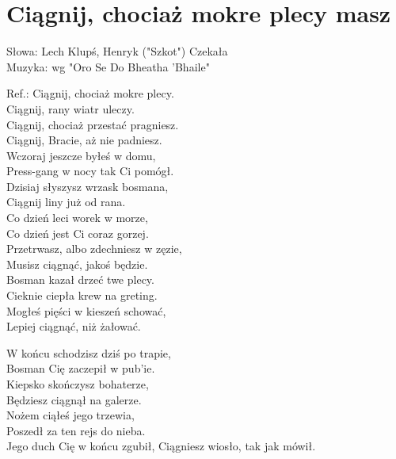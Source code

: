 \section{Ciągnij, chociaż mokre plecy masz}


Słowa: Lech Klupś, Henryk ("Szkot") Czekała\\
Muzyka:  wg "Oro Se Do Bheatha 'Bhaile"

\vspace{1em}
Ref.: Ciągnij, chociaż mokre plecy. \\
Ciągnij, rany wiatr uleczy. \\
Ciągnij, chociaż przestać pragniesz. \\
Ciągnij, Bracie, aż nie padniesz. \\

Wczoraj jeszcze byłeś w domu, \\
Press-gang w nocy tak Ci pomógł. \\
Dzisiaj słyszysz wrzask bosmana, \\
Ciągnij liny już od rana. \\

Co dzień leci worek w morze, \\
Co dzień jest Ci coraz gorzej. \\
Przetrwasz, albo zdechniesz w zęzie, \\
Musisz ciągnąć, jakoś będzie. \\

Bosman kazał drzeć twe plecy. \\
Cieknie ciepła krew na greting. \\
Mogłeś pięści w kieszeń schować, \\
Lepiej ciągnąć, niż żałować. \\

\begin{multicols}{2}
W końcu schodzisz dziś po trapie, \\
Bosman Cię zaczepił w pub'ie. \\
Kiepsko skończysz bohaterze, \\
Będziesz ciągnął na galerze. \\


Nożem ciąłeś jego trzewia, \\
Poszedł za ten rejs do nieba. \\
Jego duch Cię w końcu zgubił,
Ciągniesz wiosło, tak jak mówił. \\
\end{multicols}